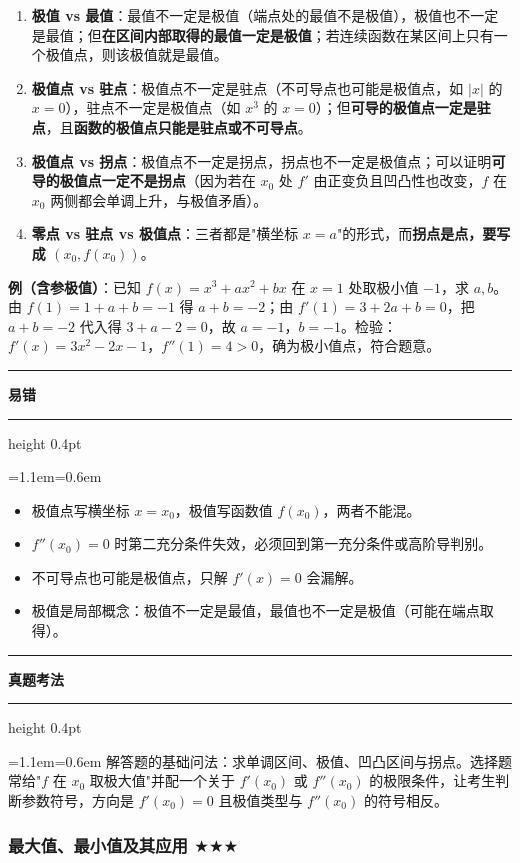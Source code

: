 \documentclass[11pt,openany,UTF8]{ctexbook}
\newcommand{\callouthead}[2]{%
  \par\addvspace{7pt}\noindent
  {\color{#1}\rule[-0.15em]{3pt}{1.05em}}\hspace{0.5em}%
  {\bfseries\color{#1}#2}\par\nobreak\vspace{-0.35em}%
  {\color{rulesep}\hrule height 0.4pt}\nobreak\vspace{0.45em}%
  \begingroup\small\setlength{\parindent}{0pt}%
  \leftskip=1.1em\rightskip=0.6em\noindent\ignorespaces}
\newcommand{\calloutend}{\par\endgroup\addvspace{7pt}}
\newenvironment{callwarn}[1]{\callouthead{warnbar}{#1}}{\calloutend}
\newenvironment{callexam}[1]{\callouthead{exambar}{#1}}{\calloutend}
\begin{document}
\begin{enumerate}
\item \textbf{极值 vs 最值}：最值不一定是极值（端点处的最值不是极值），极值也不一定是最值；但\textbf{在区间内部取得的最值一定是极值}；若连续函数在某区间上只有一个极值点，则该极值就是最值。
\item \textbf{极值点 vs 驻点}：极值点不一定是驻点（不可导点也可能是极值点，如 $|x|$ 的 $x=0$），驻点不一定是极值点（如 $x^3$ 的 $x=0$）；但\textbf{可导的极值点一定是驻点}，且\textbf{函数的极值点只能是驻点或不可导点}。
\item \textbf{极值点 vs 拐点}：极值点不一定是拐点，拐点也不一定是极值点；可以证明\textbf{可导的极值点一定不是拐点}（因为若在 $x_0$ 处 $f'$ 由正变负且凹凸性也改变，$f$ 在 $x_0$ 两侧都会单调上升，与极值矛盾）。
\item \textbf{零点 vs 驻点 vs 极值点}：三者都是"横坐标 $x=a$"的形式，而\textbf{拐点是点，要写成 $(x_0,f(x_0))$}。
\end{enumerate}
\textbf{例（含参极值）}：已知 $f(x)=x^3+ax^2+bx$ 在 $x=1$ 处取极小值 $-1$，求 $a,b$。 由 $f(1)=1+a+b=-1$ 得 $a+b=-2$；由 $f'(1)=3+2a+b=0$，把 $a+b=-2$ 代入得 $3+a-2=0$，故 $a=-1$，$b=-1$。检验：$f'(x)=3x^2-2x-1$，$f''(1)=4>0$，确为极小值点，符合题意。

\begin{callwarn}{易错}
\begin{itemize}
\item 极值点写横坐标 $x=x_0$，极值写函数值 $f(x_0)$，两者不能混。
\item $f''(x_0)=0$ 时第二充分条件失效，必须回到第一充分条件或高阶导判别。
\item 不可导点也可能是极值点，只解 $f'(x)=0$ 会漏解。
\item 极值是局部概念：极值不一定是最值，最值也不一定是极值（可能在端点取得）。
\end{itemize}
\end{callwarn}

\begin{callexam}{真题考法}
解答题的基础问法：求单调区间、极值、凹凸区间与拐点。选择题常给"$f$ 在 $x_0$ 取极大值"并配一个关于 $f'(x_0)$ 或 $f''(x_0)$ 的极限条件，让考生判断参数符号，方向是 $f'(x_0)=0$ 且极值类型与 $f''(x_0)$ 的符号相反。

\end{callexam}

\subsubsection{最大值、最小值及其应用 $\bigstar$$\bigstar$$\bigstar$}
\end{document}
